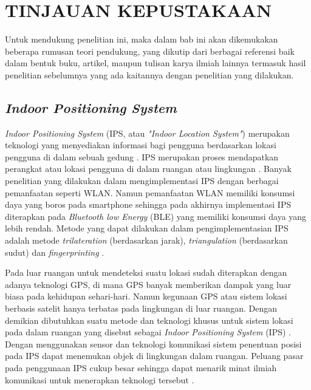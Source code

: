 \fancyhf{} 
\fancyfoot[C]{\thepage}
\chapter{TINJAUAN KEPUSTAKAAN}

\par Untuk mendukung penelitian ini, maka dalam bab ini akan dikemukakan beberapa rumusan teori pendukung, yang dikutip dari berbagai referensi baik dalam bentuk buku, artikel, maupun tulisan karya ilmiah lainnya termasuk hasil penelitian sebelumnya yang ada kaitannya dengan penelitian yang dilakukan.

\section{\textit{Indoor Positioning System}}
\textit{Indoor Positioning System} (IPS, atau \textit{"Indoor Location System"}) merupakan teknologi yang menyediakan informasi bagi pengguna berdasarkan lokasi pengguna di dalam sebuah gedung \citep{brena2017evolution}. IPS merupakan proses mendapatkan perangkat atau lokasi pengguna di dalam ruangan atau lingkungan \citep{zafari2019survey}. Banyak penelitian yang dilakukan dalam mengimplementasi IPS dengan berbagai pemanfaatan seperti WLAN. Namun pemanfaatan WLAN memiliki konsumsi daya yang boros pada smartphone sehingga pada akhirnya implementasi IPS diterapkan pada \textit{Bluetooth low Energy} (BLE) yang memiliki konsumsi daya yang lebih rendah. Metode yang dapat dilakukan dalam pengimplementasian IPS adalah metode \textit{trilateration} (berdasarkan jarak), \textit{triangulation} (berdasarkan sudut) dan \textit{fingerprinting} \citep{puspitasari2020}.

\par Pada luar ruangan untuk mendeteksi suatu lokasi sudah diterapkan dengan adanya teknologi GPS, di mana GPS banyak memberikan dampak yang luar biasa pada kehidupan sehari-hari. Namun kegunaan GPS atau sistem lokasi berbasis satelit hanya terbatas pada lingkungan di luar ruangan. Dengan demikian dibutuhkan suatu metode dan teknologi khusus untuk sistem lokasi pada dalam ruangan yang disebut sebagai \textit{Indoor Positioning System} (IPS) \citep{brena2017evolution}. Dengan menggunakan sensor dan teknologi komunikasi sistem penentuan posisi pada IPS dapat menemukan objek di lingkungan dalam ruangan. Peluang pasar pada penggunaan IPS cukup besar sehingga dapat menarik minat ilmiah komunikasi untuk menerapkan teknologi tersebut \citep{brena2017evolution}.

